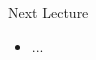 \documentclass[aspectratio=1610]{beamer}
\begin{document}

%			
%			

\begin{frame}[wide]{Next Lecture}
	\begin{itemize}
		\item ...
	\end{itemize}
\end{frame}
\end{document}
